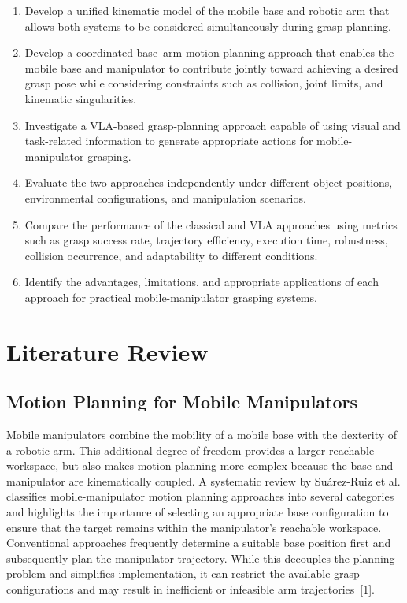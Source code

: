 \documentclass[12pt,a4paper]{article}
\begin{document}
\begin{enumerate}
  \item Develop a unified kinematic model of the mobile base and robotic arm that allows both
        systems to be considered simultaneously during grasp planning.
  \item Develop a coordinated base--arm motion planning approach that enables the mobile
        base and manipulator to contribute jointly toward achieving a desired grasp pose while
        considering constraints such as collision, joint limits, and kinematic singularities.
  \item Investigate a VLA-based grasp-planning approach capable of using visual and task-related
        information to generate appropriate actions for mobile-manipulator grasping.
  \item Evaluate the two approaches independently under different object positions,
        environmental configurations, and manipulation scenarios.
  \item Compare the performance of the classical and VLA approaches using metrics such as
        grasp success rate, trajectory efficiency, execution time, robustness, collision occurrence,
        and adaptability to different conditions.
  \item Identify the advantages, limitations, and appropriate applications of each approach for
        practical mobile-manipulator grasping systems.
\end{enumerate}

\section*{Literature Review}

\subsection*{Motion Planning for Mobile Manipulators}

Mobile manipulators combine the mobility of a mobile base with the dexterity of a
robotic arm. This additional degree of freedom provides a larger reachable workspace, but also
makes motion planning more complex because the base and manipulator are kinematically
coupled. A systematic review by Su\'arez-Ruiz et al. classifies mobile-manipulator motion
planning approaches into several categories and highlights the importance of selecting an
appropriate base configuration to ensure that the target remains within the manipulator's
reachable workspace. Conventional approaches frequently determine a suitable base position
first and subsequently plan the manipulator trajectory. While this decouples the planning
problem and simplifies implementation, it can restrict the available grasp configurations and
may result in inefficient or infeasible arm trajectories~[1].
\end{document}
